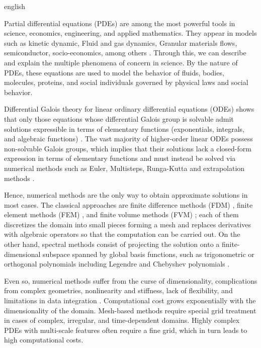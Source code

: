 \documentclass[0000.tex]{subfiles}
\begin{document}

\begin{hyphenrules}{english}

\label{ch:introduction}

Partial differential equations (PDEs) are among the most powerful tools in science, economics, 
engineering, and applied mathematics. They appear in models such as kinetic dynamic, Fluid and gas dynamics, 
Granular materials flows, semiconductor, socio-economics, among others \cite{markowich2007applied}.
Through this, we can describe and explain the multiple phenomena of concern in science. By the nature
of PDEs, these equations are used to model the behavior of fluids, bodies, molecules, proteins, and
social individuals governed by physical laws and social behavior.

Differential Galois theory for linear ordinary differential equations (ODEs) shows that only those
equations whose differential Galois group is solvable admit solutions expressible in terms of
elementary functions (exponentials, integrals, and algebraic functions)
\cite{vanderput2003}. The vast majority of higher-order linear ODEs possess
non-solvable Galois groups, which implies that their solutions lack a closed-form expression in terms
of elementary functions and must instead be solved via numerical methods such as Euler, Multisteps, 
Runga-Kutta and extrapolation methods \cite{hairer1993solving, iserles1996first}.

Hence, numerical methods are the only way to obtain approximate solutions in most cases. The classical
approaches are finite difference methods (FDM) \cite{strikwerda2004}, finite element methods (FEM)
\cite{zienkiewicz2013}, and finite volume methods (FVM) \cite{moukalled2016}; each of them
discretizes the domain into small pieces forming a mesh and replaces derivatives with algebraic
operators so that the computation can be carried out. On the other hand, spectral methods consist of
projecting the solution onto a finite-dimensional subspace spanned by global basis functions, such as
trigonometric or orthogonal polynomials including Legendre and Chebyshev polynomials
\cite{shen2011}.

Even so, numerical methods suffer from the curse of dimensionality, complications from complex
geometries, nonlinearity and stiffness, lack of flexibility, and limitations in data integration
\cite{schwencke2025thesis}. Computational cost grows exponentially with the dimensionality of the
domain. Mesh-based methods require special grid treatment in cases of complex, irregular, and
time-dependent domains. Highly complex PDEs with multi-scale features often require a fine grid,
which in turn leads to high computational costs.


\end{hyphenrules}
\end{document}
